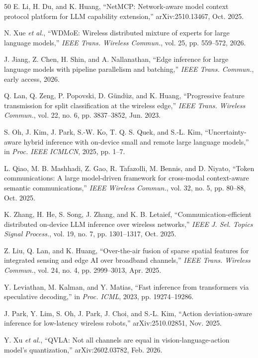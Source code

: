 \documentclass[letterpaper,journal]{IEEEtran}
\newcommand{\etal}{\emph{et al.}}
\begin{document}
\begin{thebibliography}{50}
E. Li, H. Du, and K. Huang, ``NetMCP: Network-aware model context protocol
platform for LLM capability extension,'' arXiv:2510.13467, Oct. 2025.

N. Xue \etal, ``WDMoE: Wireless distributed mixture of experts for large
language models,'' \emph{IEEE Trans. Wireless Commun.}, vol. 25,
pp. 559--572, 2026.

J. Jiang, Z. Chen, H. Shin, and A. Nallanathan, ``Edge inference for large
language models with pipeline parallelism and batching,'' \emph{IEEE Trans.
Commun.}, early access, 2026.

Q. Lan, Q. Zeng, P. Popovski, D. G\"und\"uz, and K. Huang, ``Progressive
feature transmission for split classification at the wireless edge,''
\emph{IEEE Trans. Wireless Commun.}, vol. 22, no. 6, pp. 3837--3852,
Jun. 2023.

S. Oh, J. Kim, J. Park, S.-W. Ko, T. Q. S. Quek, and S.-L. Kim,
``Uncertainty-aware hybrid inference with on-device small and remote large
language models,'' in \emph{Proc. IEEE ICMLCN}, 2025, pp. 1--7.

L. Qiao, M. B. Mashhadi, Z. Gao, R. Tafazolli, M. Bennis, and D. Niyato,
``Token communications: A large model-driven framework for cross-modal
context-aware semantic communications,'' \emph{IEEE Wireless Commun.},
vol. 32, no. 5, pp. 80--88, Oct. 2025.

K. Zhang, H. He, S. Song, J. Zhang, and K. B. Letaief,
``Communication-efficient distributed on-device LLM inference over wireless
networks,'' \emph{IEEE J. Sel. Topics Signal Process.}, vol. 19, no. 7,
pp. 1301--1317, Oct. 2025.

Z. Liu, Q. Lan, and K. Huang, ``Over-the-air fusion of sparse spatial
features for integrated sensing and edge AI over broadband channels,''
\emph{IEEE Trans. Wireless Commun.}, vol. 24, no. 4, pp. 2999--3013,
Apr. 2025.

Y. Leviathan, M. Kalman, and Y. Matias, ``Fast inference from transformers
via speculative decoding,'' in \emph{Proc. ICML}, 2023, pp. 19274--19286.

J. Park, Y. Lim, S. Oh, J. Park, J. Choi, and S.-L. Kim, ``Action
deviation-aware inference for low-latency wireless robots,''
arXiv:2510.02851, Nov. 2025.

Y. Xu \etal, ``QVLA: Not all channels are equal in vision-language-action
model's quantization,'' arXiv:2602.03782, Feb. 2026.


\end{thebibliography}
\end{document}
